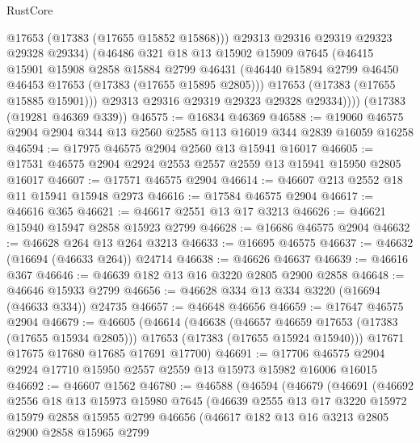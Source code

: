 \begin{lexlean}{RustCore}
\begin{coremodule}
              @17653
              (@17383 (@17655 @15852 @15868)))
            @29313
            @29316
            @29319
            @29323
            @29328
            @29334)
          (@46486
            @321
            @18
            @13
            @15902
            @15909
            @7645
            (@46415
              @15901
              @15908
              @2858
              @15884
              @2799
              @46431
              (@46440 @15894 @2799 @46450 @46453 @17653 (@17383 (@17655 @15895 @2805)))
              @17653
              (@17383 (@17655 @15885 @15901)))
            @29313
            @29316
            @29319
            @29323
            @29328
            @29334))))
    (@17383 (@19281 @46369 @339))
@46575 := @16834 @46369
@46588 := @19060 @46575 @2904 @2904 @344 @13 @2560 @2585 @113 @16019 @344 @2839 @16059 @16258
@46594 := @17975 @46575 @2904 @2560 @13 @15941 @16017
@46605 := @17531 @46575 @2904 @2924 @2553 @2557 @2559 @13 @15941 @15950 @2805 @16017
@46607 := @17571 @46575 @2904
@46614 := @46607 @213 @2552 @18 @11 @15941 @15948 @2973
@46616 := @17584 @46575 @2904
@46617 := @46616 @365
@46621 := @46617 @2551 @13 @17 @3213
@46626 := @46621 @15940 @15947 @2858 @15923 @2799
@46628 := @16686 @46575 @2904
@46632 := @46628 @264 @13 @264 @3213
@46633 := @16695 @46575
@46637 := @46632 (@16694 (@46633 @264)) @24714
@46638 := @46626 @46637
@46639 := @46616 @367
@46646 := @46639 @182 @13 @16 @3220 @2805 @2900 @2858
@46648 := @46646 @15933 @2799
@46656 := @46628 @334 @13 @334 @3220 (@16694 (@46633 @334)) @24735
@46657 := @46648 @46656
@46659 := @17647 @46575 @2904
@46679 := @46605
    (@46614
      (@46638
        (@46657 @46659 @17653 (@17383 (@17655 @15934 @2805)))
        @17653
        (@17383 (@17655 @15924 @15940)))
      @17671
      @17675
      @17680
      @17685
      @17691
      @17700)
@46691 := @17706 @46575 @2904 @2924 @17710 @15950 @2557 @2559 @13 @15973 @15982 @16006 @16015
@46692 := @46607 @1562
@46780 := @46588
    (@46594
      (@46679
        (@46691
          (@46692
            @2556
            @18
            @13
            @15973
            @15980
            @7645
            (@46639
              @2555
              @13
              @17
              @3220
              @15972
              @15979
              @2858
              @15955
              @2799
              @46656
              (@46617
                @182
                @13
                @16
                @3213
                @2805
                @2900
                @2858
                @15965
                @2799

\end{coremodule}
\end{lexlean}
